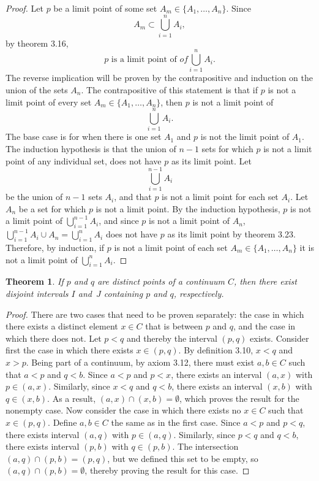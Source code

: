 \documentclass{amsart}
\newtheorem{theorem}{Theorem}
\newcommand{\1}{\mathds{1}}
\numberwithin{equation}{section}
\numberwithin{theorem}{section}
\begin{document}
\begin{proof}
	Let $p$ be a limit point of some set $A_m\in\{A_1, \dotsc, A_n\}$. Since $$A_m\subset \bigcup_{i=1}^n A_i,$$ by theorem 3.16, $$p \text{ is a limit point of } of \bigcup_{i=1}^n A_i.$$ The reverse implication will be proven by the contrapositive and induction on the union of the sets $A_n$. The contrapositive of this statement is that if $p$ is not a limit point of every set $A_m\in\{A_1, \dotsc, A_n\}$, then $p$ is not a limit point of $$\bigcup_{i=1}^n A_i.$$ The base case is for when there is one set $A_1$ and $p$ is not the limit point of $A_1$.
	The induction hypothesis is that the union of $n-1$ sets for which $p$ is not a limit point of any individual set, does not have $p$ as its limit point. Let $$\bigcup_{i=1}^{n-1} A_i$$ be the union of $n-1$ sets $A_i$, and that $p$ is not a limit point for each set $A_i$. Let $A_n$ be a set for which $p$ is not a limit point. By the induction hypothesis, $p$ is not a limit point of $\bigcup_{i=1}^{n-1} A_i$, and since $p$ is not a limit point of $A_n$, $\bigcup_{i=1}^{n-1} A_i \cup A_{n} = \bigcup_{i=1}^n A_i$ does not have $p$ as its limit point by theorem 3.23. Therefore, by induction, if $p$ is not a limit point of each set $A_m\in\{A_1, \dotsc, A_n\}$ it is not a limit point of $\bigcup_{i=1}^{n} A_i$.
\end{proof}	

\begin{theorem}  If $p$ and $q$ are distinct points of a continuum $C$, then there exist disjoint intervals $I$ and~$J$ containing $p$ and $q$, respectively.
\end{theorem}

\begin{proof}
	There are two cases that need to be proven separately: the case in which there exists a distinct element $x\in C$ that is between $p$ and $q$, and the case in which there does not. Let $p<q$ and thereby the interval $(p,q)$ exists. Consider first the case in which there exists $x\in (p,q)$. By definition 3.10, $x<q$ and $x>p$. Being part of a continuum, by axiom 3.12, there must exist $a,b\in C$ such that $a<p$ and $q<b$. Since $a<p$ and $p<x$, there exists an interval $(a,x)$ with $p\in (a,x)$. Similarly, since $x<q$ and $q<b$, there exists an interval $(x,b)$ with $q\in (x,b)$. As a result, $(a,x) \cap (x,b) = \emptyset$, which proves the result for the nonempty case. Now consider the case in which there exists no $x\in C$ such that $x\in (p,q)$. Define $a,b\in C$ the same as in the first case. Since $a<p$ and
	$p<q$, there exists interval $(a,q)$ with $p\in (a,q)$. Similarly, since $p<q$ and
	$q<b$, there exists interval $(p,b)$ with $q\in (p,b)$. The intersection $(a,q)\cap (p,b) = (p,q)$, but we defined this set to be empty, so $(a,q)\cap (p,b) = \emptyset$, thereby proving the result for this case.
\end{proof}
\end{document}
